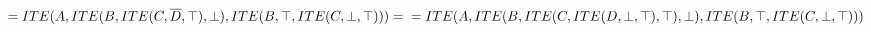 \documentclass[12pt]{article}
\begin{document}
\begin{enumerate}
\begin{equation*}
		    = ITE(A, ITE(B, ITE(C, \overline{D}, \top), \bot), ITE(B, \top, ITE(C, \bot, \top))) = \\
		    
		    = ITE(A, ITE(B, ITE(C, ITE(D, \bot, \top), \top), \bot), ITE(B, \top, ITE(C, \bot, \top)))
		    
		\end{equation*}
		
	\end{enumerate}
	
	
	
    
\end{document}
